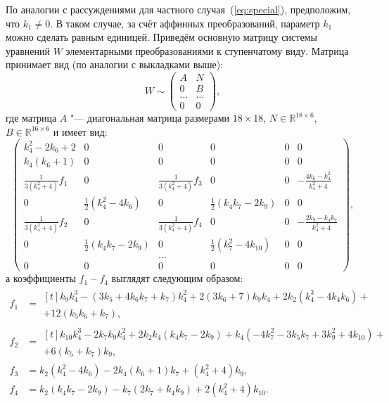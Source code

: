 \documentclass[../main.tex]{subfiles}
\begin{document}
По аналогии с рассуждениями для частного случая~(\ref{eq:special}), предположим, что $k_1 \ne 0 $. В таком случае, за счёт аффинных преобразований, параметр $k_1$ можно сделать равным единицей. Приведём основную матрицу системы уравнений $W$ элементарными преобразованиями к ступенчатому виду. Матрица принимает вид (по аналогии с выкладками выше):
\begin{equation*}
W \sim
\begin{pmatrix}
A & N \\
0 & B \\
\hdots & \hdots  \\
0 & 0
\end{pmatrix},
\end{equation*}
где матрица $A$ "--- диагональная матрица размерами $18\times18$, $N\in \mathbb{R}^{18\times6}$, $B \in \mathbb{R}^{16\times6}$ и имеет вид:
\begin{equation}\label{eq:matrix_general}
{\left(
\begin{array}{cccccc}
 k_4^2-2 k_6+2 & 0 & 0 & 0 & 0 & 0 \\
 k_4 \left(k_6+1\right) & 0 & 0 & 0 & 0 & 0 \\
 \frac{1}{3\left(k_4^2+4\right)}f_1 & 0 & \frac{1}{3 \left(k_4^2+4\right)}f_3 & 0 & 0 & -\frac{4
   k_6-k_4^2}{k_4^2+4} \\
 0 & \frac{1}{2} \left(k_4^2-4 k_6\right) & 0 & \frac{1}{2} \left(k_4 k_7-2 k_9\right) & 0 & 0 \\
 \frac{1}{3\left(k_4^2+4\right)}f_2 & 0 & \frac{1}{3 \left(k_4^2+4\right)}f_4 & 0 & 0 & -\frac{2k_9-k_4 k_7}{k_4^2+4} \\
 0 & \frac{1}{2} \left(k_4 k_7-2 k_9\right) & 0 & \frac{1}{2} \left(k_7^2-4 k_{10}\right) & 0 & 0 \\
  &  & \hdots &  &  & \\
 0 & 0 & 0 & 0 & 0 & 0
\end{array}
\right)},
\end{equation}
а коэффициенты $f_1$ -- $f_4$ выглядят следующим образом:
\begin{align*}
f_1 &=
\begin{multlined}[t]
k_9 k_4^3-\left(3 k_5+4 k_6 k_7+k_7\right) k_4^2+2 \left(3 k_6+7\right) k_9 k_4+2 k_2 \left(k_4^3-4 k_4 k_6\right) + \\
+ 12 \left(k_5 k_6+k_7\right),
\end{multlined}\\
f_2 &=
\begin{multlined}[t]
k_{10} k_4^3-2 k_7 k_9 k_4^2+2 k_2 k_4 \left(k_4 k_7-2 k_9\right) + k_4\left(-4 k_7^2-3 k_5 k_7+3 k_9^2+4 k_{10}\right) + 
\\ + 6 \left(k_5+k_7\right) k_9,
\end{multlined}\\
f_3 &= k_2 \left(k_4^2-4 k_6\right)-2 k_4 \left(k_6+1\right) k_7+\left(k_4^2+4\right) k_9, \\
f_4 &= k_2 \left(k_4 k_7-2 k_9\right)-k_7 \left(2 k_7+k_4 k_9\right)+2 \left(k_4^2+4\right) k_{10}.
\end{align*}
\end{document}
